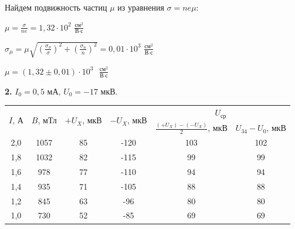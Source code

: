 \documentclass[a4paper,12pt]{article} %
\begin{document}
\vspace{7mm}
Найдем подвижность частиц $\mu$ из уравнения $\sigma = ne\mu$:

$\mu = \frac{\sigma}{ne} = 1,32\cdot 10^2$ $\frac{\text{см}^2}{\text{В}\cdot\text{с}}$

$\sigma_{\mu} = \mu \sqrt{\left(\frac{\sigma_{\sigma}}{\sigma}\right)^2 + \left(\frac{\sigma_n}{n}\right)^2} = 0,01\cdot 10^3$ $\frac{\text{см}^2}{\text{В}\cdot\text{с}}$

\vspace{3mm}
$\boxed{\mu = (1,32 \pm 0,01)\cdot 10^3 \text{ }\frac{\text{см}^2}{\text{В}\cdot\text{с}}}$


{\Large \textbf{2.}} $I_0 = 0,5$ мА, $U_0 = -17$ мкВ.

\begin{table}[h!]
	\centering
	\begin{tabular}{|c|c|c|c|c|c|}
		\hline
		\multirow{2}{*}{$I$, А} & \multirow{2}{*}{$B$, мТл} & \multirow{2}{*}{$+U_X$, мкВ} & \multirow{2}{*}{$-U_X$, мкВ} & \multicolumn{2}{c|}{$U_{\text{ср}}$}                   \\ \cline{5-6} 
		&                           &                              &                              & $\frac{(+U_X) - (-U_X)}{2}$, мкВ & $U_{34} - U_0$, мкВ \\ \hline
		2,0                     & 1057                      & 85                           & -120                         & 103                              & 102                 \\ \hline
		1,8                     & 1032                      & 82                           & -115                         & 99                               & 99                  \\ \hline
		1,6                     & 978                       & 77                           & -110                         & 94                               & 94                  \\ \hline
		1,4                     & 935                       & 71                           & -105                         & 88                               & 88                  \\ \hline
		1,2                     & 845                       & 63                           & -96                          & 80                               & 80                  \\ \hline
		1,0                     & 730                       & 52                           & -85                          & 69                               & 69                  \\ \hline

\end{tabular}
\end{table}
\end{document}
